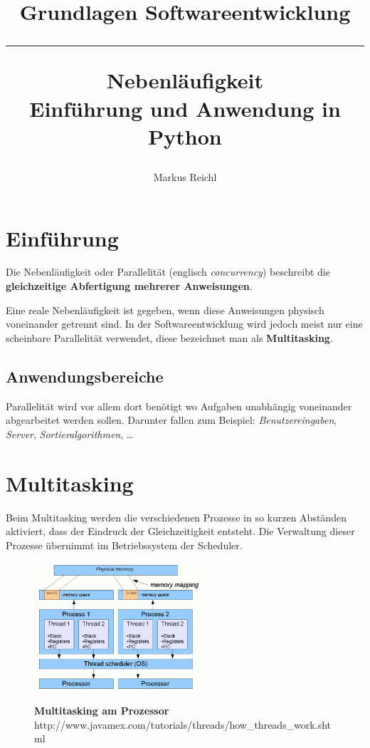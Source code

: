 \documentclass[a4paper,11pt]{article}
\title{
    \begin{center}
        \Large{Grundlagen Softwareentwicklung}\\
        \rule{0.5\textwidth}{0.1 mm}
    \end{center}
    \vspace{1 em}
    \huge{Nebenläufigkeit} \vspace{0.5 em} \\
    \large{Einführung und Anwendung in Python} \vspace{1.5 em}
}
\author{Markus Reichl}
\begin{document}
\maketitle

\tableofcontents

\section{Einf\"uhrung}
\begin{flushleft}
Die Nebenl\"aufigkeit oder Parallelit\"at (englisch \textit{concurrency}) beschreibt die \textbf{gleichzeitige Abfertigung mehrerer Anweisungen}.
\end{flushleft}
Eine reale Nebenl\"aufigkeit ist gegeben, wenn diese Anweisungen physisch voneinander getrennt sind.
In der Softwareentwicklung wird jedoch meist nur eine scheinbare Parallelit\"at verwendet, diese bezeichnet man als \textbf{Multitasking}.

\subsection{Anwendungsbereiche}
Parallelit\"at wird vor allem dort ben\"otigt wo Aufgaben unabh\"angig voneinander abgearbeitet werden sollen.
Darunter fallen zum Beispiel: \textit{Benutzereingaben}, \textit{Server}, \textit{Sortieralgorithmen}, \dots

\newpage
\section{Multitasking}

Beim Multitasking werden die verschiedenen Prozesse in so kurzen Abst\"anden aktiviert, dass der Eindruck der Gleichzeitigkeit entsteht.
Die Verwaltung dieser Prozesse \"ubernimmt im Betriebssystem der Scheduler.

\begin{figure}[ht]
\centering
\includegraphics[width=0.55\textwidth]{imgs/ThreadDiagram.png}

\tiny{\textbf{Multitasking am Prozessor}\\ http://www.javamex.com/tutorials/threads/how\_threads\_work.shtml}
\end{figure}
\end{document}
